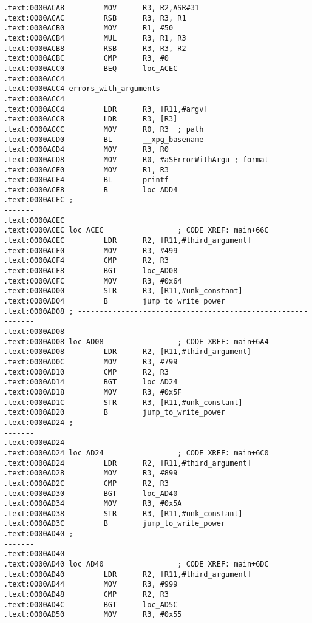 \begin{lstlisting}
.text:0000ACA8         MOV      R3, R2,ASR#31
.text:0000ACAC         RSB      R3, R3, R1
.text:0000ACB0         MOV      R1, #50
.text:0000ACB4         MUL      R3, R1, R3
.text:0000ACB8         RSB      R3, R3, R2
.text:0000ACBC         CMP      R3, #0
.text:0000ACC0         BEQ      loc_ACEC
.text:0000ACC4
.text:0000ACC4 errors_with_arguments
.text:0000ACC4                                         
.text:0000ACC4         LDR      R3, [R11,#argv]
.text:0000ACC8         LDR      R3, [R3]
.text:0000ACCC         MOV      R0, R3  ; path
.text:0000ACD0         BL       __xpg_basename
.text:0000ACD4         MOV      R3, R0
.text:0000ACD8         MOV      R0, #aSErrorWithArgu ; format
.text:0000ACE0         MOV      R1, R3
.text:0000ACE4         BL       printf
.text:0000ACE8         B        loc_ADD4
.text:0000ACEC ; ------------------------------------------------------------
.text:0000ACEC
.text:0000ACEC loc_ACEC                 ; CODE XREF: main+66C
.text:0000ACEC         LDR      R2, [R11,#third_argument]
.text:0000ACF0         MOV      R3, #499
.text:0000ACF4         CMP      R2, R3
.text:0000ACF8         BGT      loc_AD08
.text:0000ACFC         MOV      R3, #0x64
.text:0000AD00         STR      R3, [R11,#unk_constant]
.text:0000AD04         B        jump_to_write_power
.text:0000AD08 ; ------------------------------------------------------------
.text:0000AD08
.text:0000AD08 loc_AD08                 ; CODE XREF: main+6A4
.text:0000AD08         LDR      R2, [R11,#third_argument]
.text:0000AD0C         MOV      R3, #799
.text:0000AD10         CMP      R2, R3
.text:0000AD14         BGT      loc_AD24
.text:0000AD18         MOV      R3, #0x5F
.text:0000AD1C         STR      R3, [R11,#unk_constant]
.text:0000AD20         B        jump_to_write_power
.text:0000AD24 ; ------------------------------------------------------------
.text:0000AD24
.text:0000AD24 loc_AD24                 ; CODE XREF: main+6C0
.text:0000AD24         LDR      R2, [R11,#third_argument]
.text:0000AD28         MOV      R3, #899
.text:0000AD2C         CMP      R2, R3
.text:0000AD30         BGT      loc_AD40
.text:0000AD34         MOV      R3, #0x5A
.text:0000AD38         STR      R3, [R11,#unk_constant]
.text:0000AD3C         B        jump_to_write_power
.text:0000AD40 ; ------------------------------------------------------------
.text:0000AD40
.text:0000AD40 loc_AD40                 ; CODE XREF: main+6DC
.text:0000AD40         LDR      R2, [R11,#third_argument]
.text:0000AD44         MOV      R3, #999
.text:0000AD48         CMP      R2, R3
.text:0000AD4C         BGT      loc_AD5C
.text:0000AD50         MOV      R3, #0x55

\end{lstlisting}
